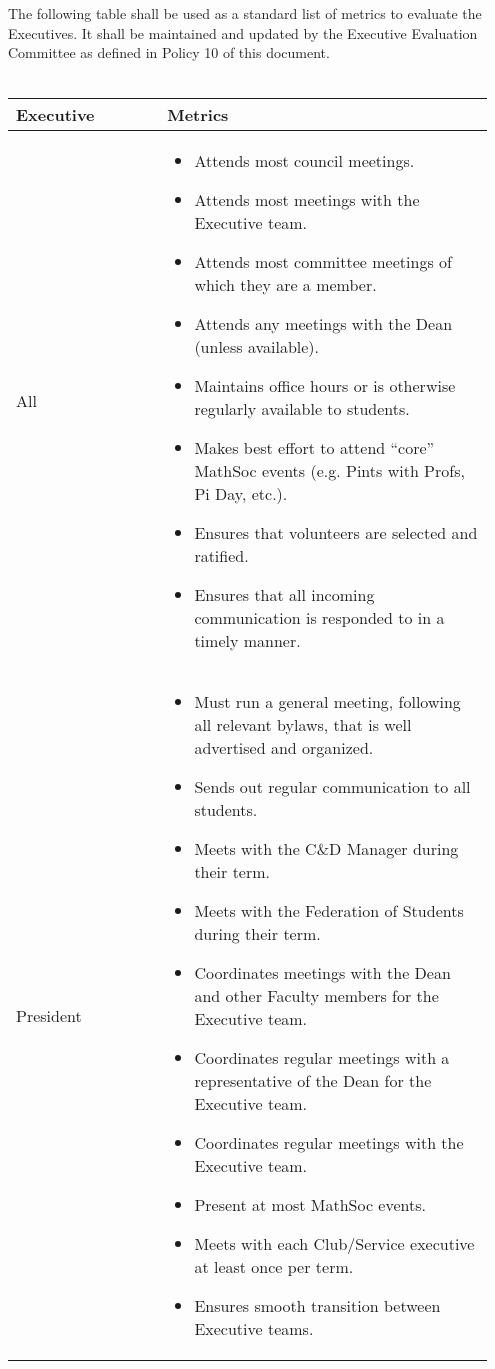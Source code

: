 \documentclass[12pt, letterpaper]{article}
\begin{document}
The following table shall be used as a standard list of metrics to evaluate the Executives. It shall be maintained and updated by the Executive Evaluation Committee as defined in Policy 10 of this document.\\
\\
\begin{longtable}{p{0.3\linewidth} p{0.65\linewidth}}
	\toprule
	Executive & Metrics\\
	\midrule
	All &
	\begin{itemize}
		\item Attends most council meetings.
		\item Attends most meetings with the Executive team.
		\item Attends most committee meetings of which they are a member.
		\item Attends any meetings with the Dean (unless available).
		\item Maintains office hours or is otherwise regularly available to students.
		\item Makes best effort to attend “core” MathSoc events (e.g. Pints with Profs, Pi Day, etc.).
		\item Ensures that volunteers are selected and ratified.
		\item Ensures that all incoming communication is responded to in a timely manner.
	\end{itemize}
	\\
	\midrule
	President &
	\begin{itemize}
		\item Must run a general meeting, following all relevant bylaws, that is well advertised and organized.
		\item Sends out regular communication to all students.
		\item Meets with the C\&D Manager during their term.
		\item Meets with the Federation of Students during their term.
		\item Coordinates meetings with the Dean and other Faculty members for
		the Executive team.
		\item Coordinates regular meetings with a representative of the Dean for the
		Executive team.
		\item Coordinates regular meetings with the Executive team.
		\item Present at most MathSoc events.
		\item Meets with each Club/Service executive at least once per term.
		\item Ensures smooth transition between Executive teams.

\end{itemize}
\end{longtable}
\end{document}
